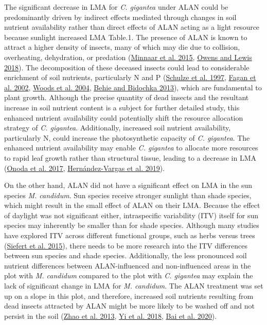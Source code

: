 \documentclass[
  12pt,
  letterpaper,
  DIV=11,
  numbers=noendperiod]{scrartcl}
\begin{document}
The significant decrease in LMA for \emph{C. gigantea} under ALAN could
be predominantly driven by indirect effects mediated through changes in
soil nutrient availability rather than direct effects of ALAN acting as
a light resource because sunlight increased LMA Table.1. The presence of
ALAN is known to attract a higher density of insects, many of which may
die due to collision, overheating, dehydration, or predation
(\protect\hyperlink{ref-Minnaar2015}{Minnaar et al. 2015},
\protect\hyperlink{ref-Owens2018}{Owens and Lewis 2018}). The
decomposition of these deceased insects could lead to considerable
enrichment of soil nutrients, particularly N and P
(\protect\hyperlink{ref-Schulze1997}{Schulze et al. 1997},
\protect\hyperlink{ref-Fagan2002}{Fagan et al. 2002},
\protect\hyperlink{ref-Woods2004}{Woods et al. 2004},
\protect\hyperlink{ref-Behie2013}{Behie and Bidochka 2013}), which are
fundamental to plant growth. Although the precise quantity of dead
insects and the resultant increase in soil nutrient content is a subject
for further detailed study, this enhanced nutrient availability could
potentially shift the resource allocation strategy of \emph{C.
gigantea}. Additionally, increased soil nutrient availability,
particularly N, could increase the photosynthetic capacity of \emph{C.
gigantea}. The enhanced nutrient availability may enable \emph{C.
gigantea} to allocate more resources to rapid leaf growth rather than
structural tissue, leading to a decrease in LMA
(\protect\hyperlink{ref-Onoda2017}{Onoda et al. 2017},
\protect\hyperlink{ref-Hernandez-Vargas2019}{Hernández-Vargas et al.
2019}).

On the other hand, ALAN did not have a significant effect on LMA in the
sun species \emph{M. candidum}. Sun species receive stronger sunlight
than shade species, which might result in the small effect of ALAN on
their LMA. Because the effect of daylight was not significant either,
intraspecific variability (ITV) itself for sun species may inherently be
smaller than for shade species. Although many studies have explored ITV
across different functional groups, such as herbs versus trees
(\protect\hyperlink{ref-Siefert2015}{Siefert et al. 2015}), there needs
to be more research into the ITV differences between sun species and
shade species. Additionally, the less pronounced soil nutrient
differences between ALAN-influenced and non-influenced areas in the plot
with \emph{M. candidum} compared to the plot with \emph{C. gigantea} may
explain the lack of significant change in LMA for \emph{M. candidum}.
The ALAN treatment was set up on a slope in this plot, and therefore,
increased soil nutrients resulting from dead insects attracted by ALAN
might be more likely to be washed off and not persist in the soil
(\protect\hyperlink{ref-Zhao2013}{Zhao et al. 2013},
\protect\hyperlink{ref-Yi2018}{Yi et al. 2018},
\protect\hyperlink{ref-Bai2020}{Bai et al. 2020}).
\end{document}
